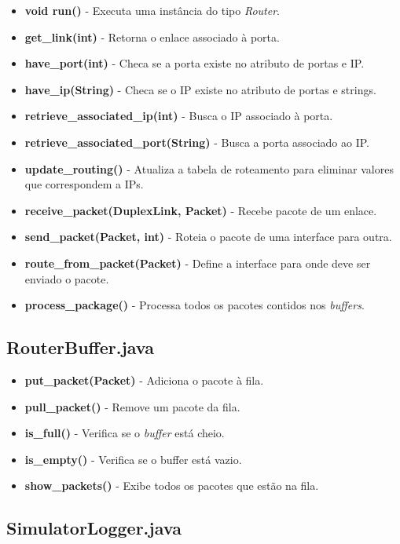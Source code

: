 \documentclass[11pt]{article}
\begin{document}
\begin{itemize}
	\item \textbf{void run()} - Executa uma instância do tipo \textit{Router}.
	\item \textbf{get_link(int)} - Retorna o enlace associado à porta.
	\item \textbf{have_port(int)} - Checa se a porta existe no atributo de portas e IP.
	\item \textbf{have_ip(String)} - Checa se o IP existe no atributo de portas e strings.
	\item \textbf{retrieve_associated_ip(int)} - Busca o IP associado à porta.
	\item \textbf{retrieve_associated_port(String)} - Busca a porta associado ao IP.
	\item \textbf{update_routing()} - Atualiza a tabela de roteamento para eliminar valores que correspondem a IPs.
	\item \textbf{receive_packet(DuplexLink, Packet)} - Recebe pacote de um enlace.
	\item \textbf{send_packet(Packet, int)} - Roteia o pacote de uma interface para outra.
	\item \textbf{route_from_packet(Packet)} - Define a interface para onde deve ser enviado o pacote.
	\item \textbf{process_package()} - Processa todos os pacotes contidos nos \textit{buffers}.
\end{itemize}

\subsection{RouterBuffer.java}

\begin{itemize}
	\item \textbf{put_packet(Packet)} - Adiciona o pacote à fila.
	\item \textbf{pull_packet()} - Remove um pacote da fila.
	\item \textbf{is_full()} - Verifica se o \textit{buffer} está cheio.
	\item \textbf{is_empty()} - Verifica se o buffer está vazio.
	\item \textbf{show_packets()} - Exibe todos os pacotes que estão na fila.
\end{itemize}

\subsection{SimulatorLogger.java}
\end{document}
